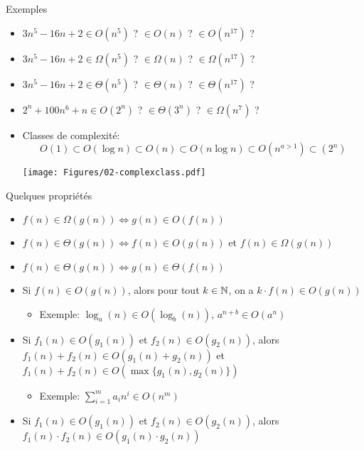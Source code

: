 \begin{frame}{Exemples}
\begin{itemize}
\item $3n^5-16n+2\in O(n^5)$ ? $\in O(n)$ ? $\in O(n^{17})$ ?
\item $3n^5-16n+2\in \Omega(n^5)$ ? $\in \Omega(n)$ ? $\in \Omega(n^{17})$ ?
\item $3n^5-16n+2\in \Theta(n^5)$ ? $\in \Theta(n)$ ? $\in \Theta(n^{17})$ ?
\item $2^n+100n^6+n \in O(2^n)$ ? $\in \Theta(3^n)$ ? $\in \Omega(n^7)$ ?

\bigskip

\item Classes de complexité: 
$$O(1)\subset O(\log n)\subset O(n) \subset O(n\log n) \subset O(n^{a>1})\subset (2^n)$$
\centerline{\texttt{[image: Figures/02-complexclass.pdf]}}
\end{itemize}
\end{frame}

\begin{frame}{Quelques propriétés}
\small
\begin{itemize}
\item $f(n)\in\Omega(g(n)) \Leftrightarrow g(n)\in O(f(n))$
\item $f(n)\in\Theta(g(n))\Leftrightarrow f(n)\in O(g(n))$ et $f(n)\in \Omega(g(n))$
\item $f(n)\in\Theta(g(n))\Leftrightarrow g(n)\in\Theta(f(n))$
\bigskip
\item Si $f(n)\in O(g(n))$, alors pour tout $k\in \mathbb{N}$, on a $k\cdot f(n)\in O(g(n))$
\begin{itemize}
\item Exemple: $\log_a(n)\in O(\log_b(n))$, $a^{n+b}\in O(a^n)$
\end{itemize}
\item Si $f_1(n)\in O(g_1(n))$ et $f_2(n)\in O(g_2(n))$, alors $f_1(n)+f_2(n)\in O(g_1(n)+g_2(n))$ et $f_1(n)+f_2(n)\in O(\max\{g_1(n),g_2(n)\})$
\begin{itemize}
\item Exemple: $\sum_{i=1}^m a_i n^i\in O(n^m)$
\end{itemize}
\item Si $f_1(n)\in O(g_1(n))$ et $f_2(n)\in O(g_2(n))$, alors $f_1(n)\cdot f_2(n)\in O(g_1(n)\cdot g_2(n))$
\end{itemize}
\end{frame}

